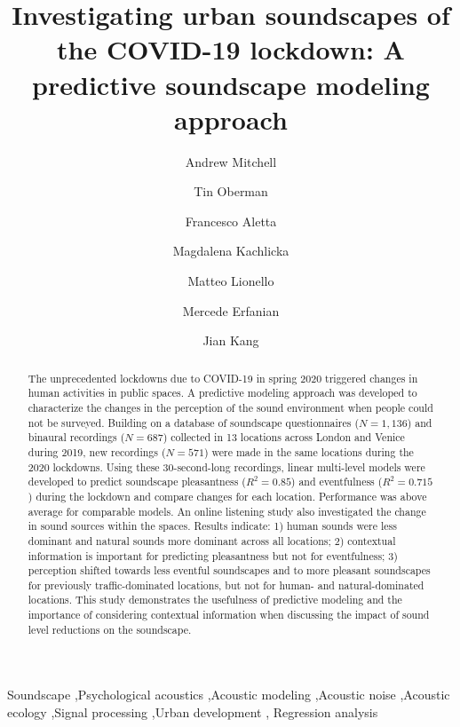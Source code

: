 \documentclass[
  authoryear,
  preprint,
  3p,
  onecolumn]{elsarticle}
\begin{document}
\begin{frontmatter}
\title{Investigating urban soundscapes of the COVID-19 lockdown: A
predictive soundscape modeling approach}
\author[1]{Andrew Mitchell%
%
}
\author[1]{Tin Oberman%
%
}
\author[1]{Francesco Aletta%
%
}
\author[1]{Magdalena Kachlicka%
%
}

\author[1]{Matteo Lionello%
%
}

\author[1]{Mercede Erfanian%
%
}

\author[1]{Jian Kang%
%
}









        
\begin{abstract}
The unprecedented lockdowns due to COVID-19 in spring 2020 triggered
changes in human activities in public spaces. A predictive modeling
approach was developed to characterize the changes in the perception of
the sound environment when people could not be surveyed. Building on a
database of soundscape questionnaires (\(N=1,136\)) and binaural
recordings (\(N=687\)) collected in 13 locations across London and
Venice during 2019, new recordings (\(N=571\)) were made in the same
locations during the 2020 lockdowns. Using these 30-second-long
recordings, linear multi-level models were developed to predict
soundscape pleasantness (\(R^2=0.85\)) and eventfulness (\(R^2=0.715\))
during the lockdown and compare changes for each location. Performance
was above average for comparable models. An online listening study also
investigated the change in sound sources within the spaces. Results
indicate: 1) human sounds were less dominant and natural sounds more
dominant across all locations; 2) contextual information is important
for predicting pleasantness but not for eventfulness; 3) perception
shifted towards less eventful soundscapes and to more pleasant
soundscapes for previously traffic-dominated locations, but not for
human- and natural-dominated locations. This study demonstrates the
usefulness of predictive modeling and the importance of considering
contextual information when discussing the impact of sound level
reductions on the soundscape.
\end{abstract}





\begin{keyword}
    Soundscape \sep Psychological acoustics \sep Acoustic
modeling \sep Acoustic noise \sep Acoustic ecology \sep Signal
processing \sep Urban development \sep 
    Regression analysis
\end{keyword}
\end{frontmatter}
\end{document}
